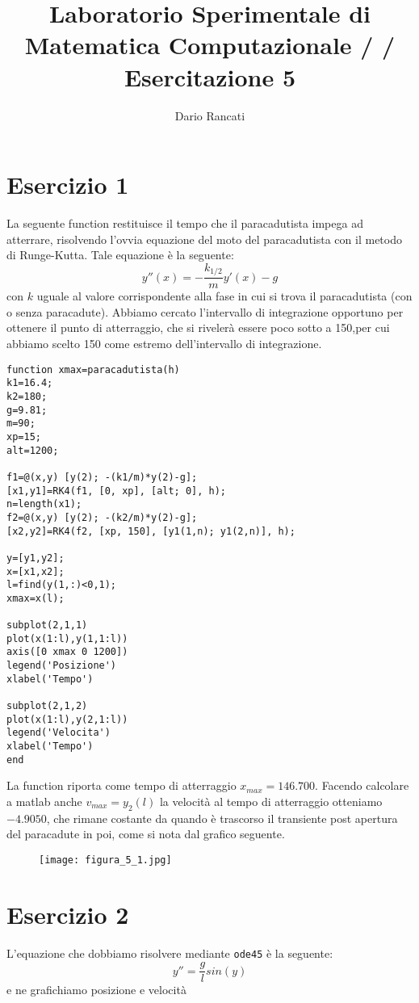 \documentclass{article}
\title{\textbf{Laboratorio Sperimentale di Matematica Computazionale / / Esercitazione 5}}
\author{Dario Rancati}
\begin{document}
\section*{Esercizio 1}

La seguente function restituisce il tempo che il paracadutista impega ad atterrare, risolvendo l'ovvia equazione del moto del paracadutista con il metodo di Runge-Kutta. Tale equazione è la seguente:
$$y''(x)=-\frac{k_{1/2}}{m}y'(x)-g$$
\noindent
con $k$ uguale al valore corrispondente alla fase in cui si trova il paracadutista (con o senza paracadute). Abbiamo cercato l'intervallo di integrazione opportuno per ottenere il punto di atterraggio, che si rivelerà essere poco sotto a 150,per cui abbiamo scelto 150 come estremo dell'intervallo di integrazione.
\begin{lstlisting}
function xmax=paracadutista(h)
k1=16.4;
k2=180;
g=9.81;
m=90;
xp=15;
alt=1200;

f1=@(x,y) [y(2); -(k1/m)*y(2)-g];
[x1,y1]=RK4(f1, [0, xp], [alt; 0], h);
n=length(x1);
f2=@(x,y) [y(2); -(k2/m)*y(2)-g];
[x2,y2]=RK4(f2, [xp, 150], [y1(1,n); y1(2,n)], h);

y=[y1,y2];
x=[x1,x2];
l=find(y(1,:)<0,1);
xmax=x(l);

subplot(2,1,1) 
plot(x(1:l),y(1,1:l))
axis([0 xmax 0 1200])
legend('Posizione')
xlabel('Tempo')

subplot(2,1,2) 
plot(x(1:l),y(2,1:l))
legend('Velocita')
xlabel('Tempo')
end
\end{lstlisting}

\noindent
La function riporta come tempo di atterraggio $x_{max}=146.700$. Facendo calcolare a matlab anche $v_{max}=y_{2}(l)$ la velocità al tempo di atterraggio otteniamo $-4.9050$, che rimane costante da quando è trascorso il transiente post apertura del paracadute in poi, come si nota dal grafico seguente.

\newpage

\begin{figure}[!h]
\centering
\texttt{[image: figura\_5\_1.jpg]}
\end{figure}

\newpage

\section*{Esercizio 2}

L'equazione che dobbiamo risolvere mediante \texttt{ode45} è la seguente:
$$y''=\frac{g}{l}sin(y)$$
\noindent
e ne grafichiamo posizione e velocità
\end{document}
